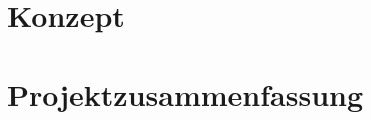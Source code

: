 
\newcommand{\Heading}{Team Gyrcopter}
\newcommand{\Modul}{Projekt Data Science}

\newcommand{\Dozent}{Dozent: Prof. Dr. Christian Hänig}





\chapter{Konzept}\thispagestyle{fancy}

\section{}



\newpage %

\chapter{Projektzusammenfassung}\thispagestyle{fancy}

\newpage %



\newpage %





